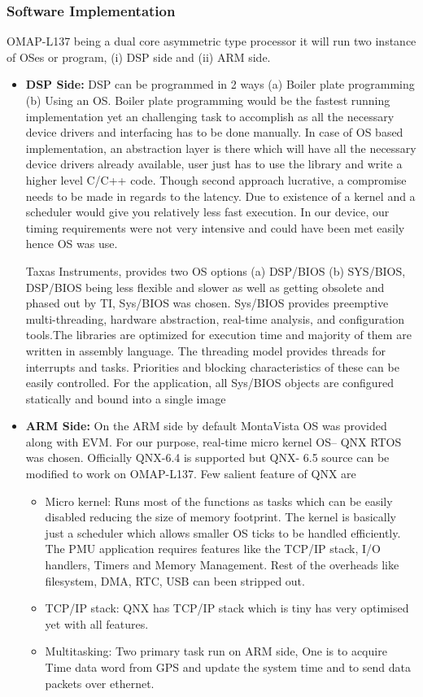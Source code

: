 \begin{appendix}
\subsubsection{Software Implementation}
OMAP-L137 being a dual core asymmetric type processor it will run two instance of OSes or program, (i) DSP side and (ii) ARM side.  

\begin{itemize}
	\item \textbf{DSP Side:}
	DSP can be programmed in 2 ways (a) Boiler plate programming (b) Using an OS. Boiler plate programming would be the fastest running implementation yet an challenging task to accomplish as all the necessary device drivers and interfacing has to be done manually. In case of OS based implementation, an abstraction layer is there which will have all the necessary device drivers already available, user just has to use the library and write a higher level C/C++ code. Though second approach lucrative, a compromise needs to be made in regards to the latency. Due to existence of a kernel and a scheduler would give you relatively less fast execution. In our device, our timing requirements were not very intensive and could have been met easily hence OS was use.
	
	Taxas Instruments, provides two OS options (a) DSP/BIOS (b) SYS/BIOS, DSP/BIOS being less flexible and slower as well as getting obsolete and phased out by TI, Sys/BIOS was chosen. Sys/BIOS provides preemptive multi-threading, hardware abstraction, real-time analysis, and configuration tools.The libraries are optimized for execution time and majority of them are written in assembly	language. The threading model provides threads for interrupts and tasks. Priorities and blocking characteristics of these can be easily controlled. For the application, all Sys/BIOS objects are configured statically and bound into a single image
	
	\item \textbf{ARM Side:} On the ARM side by default MontaVista OS was provided along with EVM. For our purpose, real-time micro kernel OS-- QNX RTOS was chosen. Officially QNX-6.4 is supported but QNX- 6.5 source can be modified to work on OMAP-L137. Few salient feature of QNX are 
	\begin{itemize}
		\item Micro kernel: Runs most of the functions as tasks which can be easily disabled reducing the size of memory footprint. The kernel is basically just a scheduler which allows smaller OS ticks to be handled efficiently. The PMU application requires features like the TCP/IP stack, I/O handlers, Timers and Memory Management. Rest of the overheads like filesystem, DMA, RTC, USB can been stripped out.
		\item TCP/IP stack: QNX has TCP/IP stack which is tiny has very optimised yet with all features.
		\item  Multitasking: Two primary task run on ARM side, One is to acquire Time data word from GPS and update the system time and to send data packets over ethernet.
	\end{itemize}


\end{itemize}
\end{appendix}
